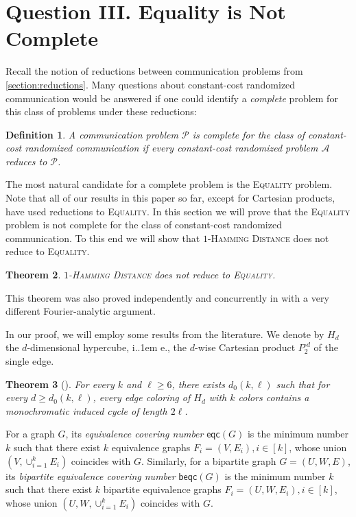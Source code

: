 \documentclass{article}
\makeatletter
\newtheorem{theorem}{Theorem}\newtheorem{lemma}[theorem]{Lemma}\newtheorem{proposition}[theorem]{Proposition}\newtheorem{corollary}[theorem]{Corollary}\newtheorem{definition}[theorem]{Definition}\newtheorem{claim}[theorem]{Claim}\newtheorem{remark}[theorem]{Remark}\newtheorem{observation}[theorem]{Observation}\newtheorem{conjecture}[theorem]{Conjecture}\newtheorem{example}[theorem]{Example}
\newcommand{\cA}{\ensuremath{\mathcal{A}}}
\newcommand{\cP}{\ensuremath{\mathcal{P}}}
\newcommand{\eqc}{\mathsf{eqc}}
\newcommand{\beqc}{\mathsf{beqc}}
\newcommand*\ie{i.\kern.1em e.\@\xspace} %
\newcommand*\EQUALITY{\textsc{Equality}\xspace}
\makeatother
\begin{document}
\section{Question III. Equality is Not Complete}
\label{section:equality}

Recall the notion of reductions between communication problems from \cref{section:reductions}.
Many questions about constant-cost randomized communication would be answered if one could identify
a \emph{complete} problem for this class of problems under these reductions:

\begin{definition}
A communication problem $\cP$ is \emph{complete} for the class of constant-cost randomized
communication if every constant-cost randomized problem $\cA$ reduces to $\cP$.
\end{definition}

The most natural candidate for a complete problem is the \EQUALITY problem. Note that all of our
results in this paper so far, except for Cartesian products, have used reductions to \EQUALITY.  In
this section we will prove that the \EQUALITY problem is not complete for the class of constant-cost
randomized communication.  To this end we will show that \textsc{$1$-Hamming Distance} does not
reduce to \EQUALITY. 

\begin{theorem}
\label{thm:1hd-to-eq}
  \textsc{$1$-Hamming Distance} does not reduce to \textsc{Equality}.
\end{theorem}

This theorem was also proved independently and concurrently in \cite{HHH23dimfree} with a very
different Fourier-analytic argument.

In our proof, we will employ some results from the literature.  We denote by $H_d$ the
$d$-dimensional hypercube, \ie, the $d$-wise Cartesian product $P_2^{\square d}$ of the single edge. 

\begin{theorem}[\cite{ARSV06}]\label{hypercubeColoring}
	For every $k$ and $\ell \geq 6$, there exists $d_0(k,\ell)$ such that 
	for every $d \geq d_0(k,\ell)$, every edge coloring of $H_d$ with $k$
	colors contains a monochromatic \emph{induced}  cycle of length $2 \ell$.
\end{theorem}

For a graph $G$, its \emph{equivalence covering number} $\eqc(G)$ is the minimum number $k$ such that there exist $k$ equivalence graphs $F_i=(V,E_i), i \in [k]$, whose union $(V, \cup_{i=1}^k E_i)$ coincides with $G$.
Similarly, for a bipartite graph $G=(U,W,E)$,
its \emph{bipartite equivalence covering number}
$\beqc(G)$ is the minimum number $k$ such that there exist $k$ bipartite equivalence graphs $F_i=(U,W,E_i), i \in [k]$, whose union $(U,W, \cup_{i=1}^k E_i)$ coincides with $G$.
\end{document}
